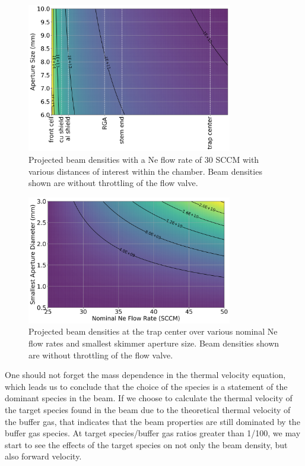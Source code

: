 \begin{figure}[H]
	\centering
	\includegraphics[width=0.8\textwidth]{images/CBGB_beam_density_over_system.png}
	\caption{Projected beam densities with a Ne flow rate of 30 SCCM with various distances of interest within the chamber. Beam densities shown are without throttling of the  flow valve.}
	\label{fig: beam_density}
\end{figure}

\begin{figure}[H]
	\centering
	\includegraphics[width=0.8\textwidth]{images/CBGB_trap_density_aperture.png}
	\caption{Projected beam densities at the trap center over various nominal Ne flow rates and smallest skimmer aperture size. Beam densities shown are without throttling of the  flow valve.}
	\label{fig: trap_density}
\end{figure}

One should not forget the mass dependence in the thermal velocity equation, which leads us to conclude that the choice of the species is a statement of the dominant species in the beam. If we choose to calculate the thermal velocity of the target species found in the beam due to the theoretical thermal velocity of the buffer gas, that indicates that the beam properties are still dominated by the buffer gas species. At target species/buffer gas ratios greater than 1/100, we may start to see the effects of the target species on not only the beam density, but also forward velocity.